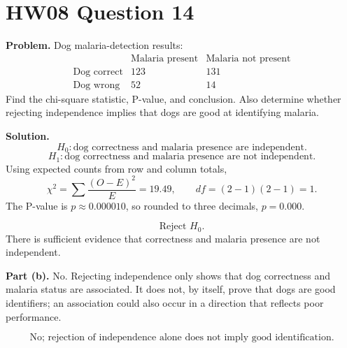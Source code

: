 \documentclass[11pt]{article}
\begin{document}
\section*{HW08 Question 14}

\textbf{Problem.} Dog malaria-detection results:
\[
\begin{array}{c|cc}
 & \text{Malaria present} & \text{Malaria not present}\\ \hline
\text{Dog correct} & 123 & 131\\
\text{Dog wrong} & 52 & 14
\end{array}
\]
Find the chi-square statistic, P-value, and conclusion. Also determine whether rejecting independence implies that dogs are good at identifying malaria.

\textbf{Solution.}
\[
H_0:\text{dog correctness and malaria presence are independent.}
\]
\[
H_1:\text{dog correctness and malaria presence are not independent.}
\]
Using expected counts from row and column totals,
\[
\chi^2=\sum\frac{(O-E)^2}{E}=19.49,\qquad df=(2-1)(2-1)=1.
\]
The P-value is \(p\approx0.000010\), so rounded to three decimals, \(p=0.000\).

\[
\boxed{\text{Reject }H_0.}
\]
There is sufficient evidence that correctness and malaria presence are not independent.

\textbf{Part (b).} No. Rejecting independence only shows that dog correctness and malaria status are associated. It does not, by itself, prove that dogs are good identifiers; an association could also occur in a direction that reflects poor performance.

\[
\boxed{\text{No; rejection of independence alone does not imply good identification.}}
\]
\end{document}
